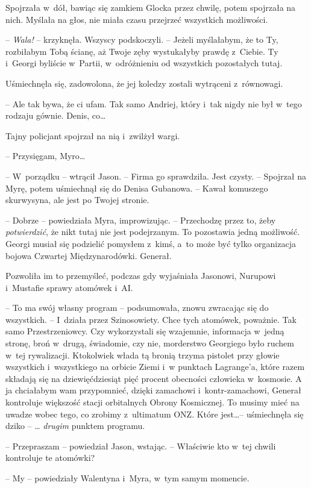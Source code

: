 \documentclass[oneside,polish,11pt,sfheadings]{mwbk}
\begin{document}
Spojrzała w~dół, bawiąc się zamkiem Glocka przez chwilę, potem spojrzała
na nich. Myślała na głos, nie miała czasu przejrzeć wszystkich
możliwości.

-- \textit{Wala! }-- krzyknęła. Wszyscy podskoczyli. -- Jeżeli myślałabym, że
to Ty, rozbiłabym Tobą ścianę, aż Twoje zęby wystukałyby prawdę z~Ciebie. Ty i~Georgi byliście w~Partii, w~odróżnieniu od wszystkich
pozostałych tutaj.

Uśmiechnęła się, zadowolona, że jej koledzy zostali wytrąceni z~równowagi. 

-- Ale tak bywa, że ci ufam. Tak samo Andriej, który i~tak nigdy nie był w~tego rodzaju gównie. Denis, co\ldots

Tajny policjant spojrzał na nią i~zwilżył wargi.

-- Przysięgam, Myro\ldots

-- W~porządku -- wtrącił Jason. -- Firma go sprawdziła. Jest czysty. -- Spojrzał na Myrę, potem uśmiechnął się do Denisa Gubanowa. -- Kawał
komuszego skurwysyna, ale jest po Twojej stronie.

-- Dobrze -- powiedziała Myra, improwizując. -- Przechodzę przez to, żeby
\textit{potwierdzić}, że nikt tutaj nie jest podejrzanym. To pozostawia
jedną możliwość. Georgi musiał się podzielić pomysłem z~kimś, a~to może
być tylko organizacja bojowa Czwartej Międzynarodówki. Generał.

Pozwoliła im to przemyśleć, podczas gdy wyjaśniała Jasonowi, Nurupowi i~Mustafie sprawy atomówek i~AI.

-- To ma swój własny program -- podsumowała, znowu zwracając się do
wszystkich. -- I~działa przez Szinosowiety. Chce tych atomówek, poważnie.
Tak samo Przestrzeniowcy. Czy wykorzystali się wzajemnie, informacja w~jedną stronę, broń w~drugą, świadomie, czy nie, morderstwo Georgiego
było ruchem w~tej rywalizacji. Ktokolwiek włada tą bronią trzyma
pistolet przy głowie wszystkich i~wszystkiego na orbicie Ziemi i~w punktach Lagrange'a, które razem składają się na dziewięćdziesiąt pięć
procent obecności człowieka w~kosmosie. A ja chciałabym wam przypomnieć,
dzięki zamachowi i~kontr-zamachowi, Generał kontroluje większość stacji
orbitalnych Obrony Kosmicznej. To musimy mieć na uwadze wobec tego, co
zrobimy z~ultimatum ONZ. Które jest\ldots -- uśmiechnęła się dziko -- \ldots
\textit{drugim} punktem programu.

-- Przepraszam -- powiedział Jason, wstając. -- Właściwie kto w~tej chwili
kontroluje te atomówki?

-- My -- powiedziały Walentyna i~Myra, w~tym samym momencie. 
\end{document}

